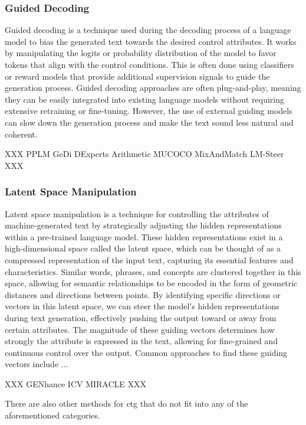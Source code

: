\subsubsection{Guided Decoding}
Guided decoding is a technique used during the decoding process of a language model to bias the generated text towards the desired control attributes. 
It works by manipulating the logits or probability distribution of the model to favor tokens that align with the control conditions.
This is often done using classifiers or reward models that provide additional supervision signals to guide the generation process.
Guided decoding approaches are often plug-and-play, meaning they can be easily integrated into existing language models without requiring extensive retraining or fine-tuning.
However, the use of external guiding models can slow down the generation process and make the text sound less natural and coherent.

XXX
PPLM
GeDi
DExperts
Arithmetic
MUCOCO
MixAndMatch
LM-Steer
XXX

\subsubsection{Latent Space Manipulation}
Latent space manipulation is a technique for controlling the attributes of machine-generated text by strategically adjusting the hidden representations within a pre-trained language model. 
These hidden representations exist in a high-dimensional space called the latent space, which can be thought of as a compressed representation of the input text, capturing its essential features and characteristics.
Similar words, phrases, and concepts are clustered together in this space, allowing for semantic relationships to be encoded in the form of geometric distances and directions between points.
By identifying specific directions or vectors in this latent space, we can steer the model's hidden representations during text generation, effectively pushing the output toward or away from certain attributes.
The magnitude of these guiding vectors determines how strongly the attribute is expressed in the text, allowing for fine-grained and continuous control over the output.
Common approaches to find these guiding vectors include ...

XXX
GENhance
ICV
MIRACLE
XXX

There are also other methods for \gls{ctg} that do not fit into any of the aforementioned categories.

